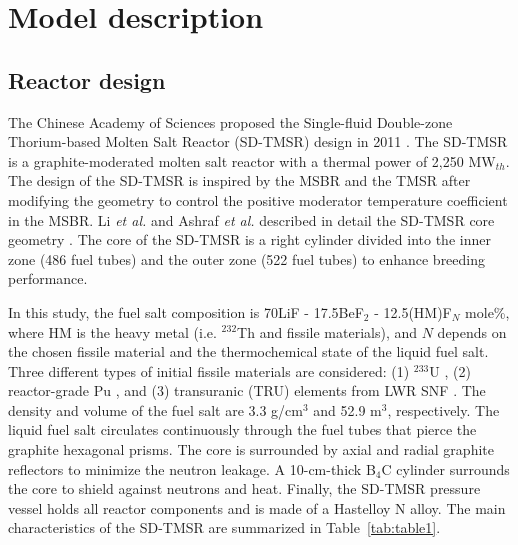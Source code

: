 \section{Model description} \label{Model-description}
\subsection{Reactor design}

The Chinese Academy of Sciences proposed the Single-fluid Double-zone Thorium-based Molten Salt Reactor (SD-TMSR) design in 2011
\cite{li_optimization_2018,jiang2012advanced,li2015analysis,li2017model}. The 
\gls{SD-TMSR} is a graphite-moderated molten salt reactor with a thermal power 
of 2,250 MW$_{th}$. The design of the \gls{SD-TMSR} is inspired by the 
\gls{MSBR} \cite{robertson_conceptual_1971} and the \gls{TMSR} 
\cite{nuttin2005potential} after modifying the geometry to control the 
positive moderator temperature coefficient in the MSBR. Li \emph{et al.} and Ashraf \emph{et al.}
described in detail the \gls{SD-TMSR} core geometry
\cite{li_optimization_2018,ashraf2020whole}. The core of the 
\gls{SD-TMSR} is a right cylinder divided into the inner zone (486 fuel tubes) 
and the outer zone (522 fuel tubes) to enhance breeding performance.

In this study, the fuel salt composition is 70LiF - 17.5BeF$_2$ - 
12.5(HM)F$_N$ mole\%, where HM is the heavy metal (i.e. $^{232}$Th and fissile 
materials), and $N$ depends on the chosen fissile material and the 
thermochemical state of the liquid fuel salt. Three different types of initial 
fissile materials are considered: (1) $^{233}$U \cite{ashraf2020whole}, 
(2) reactor-grade Pu \cite{marka1993explosive}, and (3) transuranic (TRU) 
elements from \gls{LWR} \gls{SNF} \cite{de2000scenarios}.
The density and volume of the fuel salt are 3.3 g/cm$^{3}$ and 52.9 m$^3$, 
respectively. The liquid fuel salt circulates continuously through the fuel 
tubes that pierce the graphite hexagonal prisms. The core is surrounded by 
axial and radial graphite reflectors to minimize the neutron leakage.
A 10-cm-thick B$_4$C cylinder surrounds the core to shield against neutrons and heat.
Finally, the \gls{SD-TMSR} pressure vessel holds all reactor components and is made of 
a Hastelloy N alloy. The main characteristics of the \gls{SD-TMSR} are 
summarized in Table~\ref{tab:table1}.


